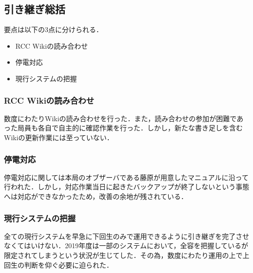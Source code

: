 \subsection*{引き継ぎ総括}


要点は以下の3点に分けられる．
 \begin{itemize}
\item RCC Wikiの読み合わせ
\item 停電対応
\item 現行システムの把握
 \end{itemize}
\subsubsection* {RCC Wikiの読み合わせ}
数度にわたりWikiの読み合わせを行った．また，読み合わせの参加が困難であった局員も各自で自主的に確認作業を行った．しかし，新たな書き足しを含むWikiの更新作業には至っていない．
\subsubsection* {停電対応}
停電対応に関しては本局のオブザーバである藤原が用意したマニュアルに沿って行われた．しかし，対応作業当日に起きたバックアップが終了しないという事態へは対応ができなかったため，改善の余地が残されている．
\subsubsection* {現行システムの把握}
全ての現行システムを早急に下回生のみで運用できるように引き継ぎを完了させなくてはいけない．2019年度は一部のシステムにおいて，全容を把握している\systemStaff{}が限定されてしまうという状況が生じてした．その為，数度にわたり運用の上で上回生の判断を仰ぐ必要に迫られた．

